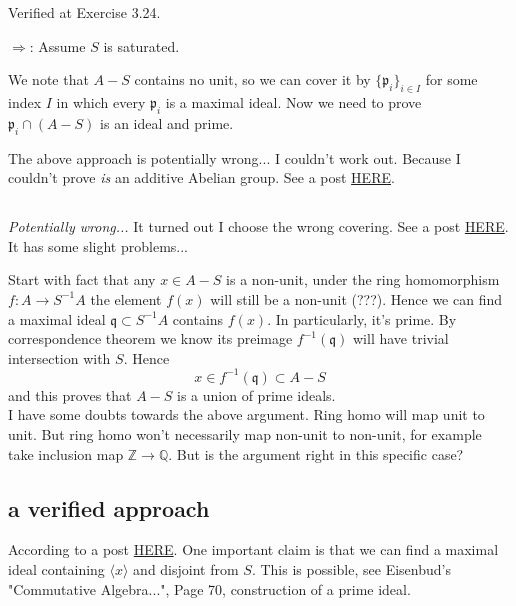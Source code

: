 Verified at \cite{altman} Exercise 3.24. 

$\Rightarrow$: Assume $S$ is saturated. 

We note that $A-S$ contains no unit, so we can cover it by $\{\mathfrak p_i\}_{i\in I}$ for some index $I$ in which every $\mathfrak p_i$ is a maximal ideal. 
Now we need to prove $\mathfrak p_i\cap (A-S)$ is an ideal and prime. 

The above approach is potentially wrong... I couldn't work out. Because I couldn't prove \textit{is} an additive Abelian group. 
See a post \href{https://math.stackexchange.com/questions/4329999/saturated-set-and-union-of-prime-ideals}{HERE}. 

\subsection{}
\textit{Potentially wrong...}
It turned out I choose the wrong covering. See a post \href{https://math.stackexchange.com/questions/3988316/proof-verification-atiyah-macdonald-exercise-3-7i}{HERE}. It has some slight problems...

Start with fact that any $x\in A-S$ is a non-unit, under the ring homomorphism $f:A\to S^{-1}A$ the element $f(x)$ will still be a non-unit (???). Hence we can find a maximal ideal $\mathfrak q\subset S^{-1}A$ contains $f(x)$. In particularly, it's prime. By correspondence theorem we know its preimage $f^{-1}(\mathfrak q)$ will have trivial intersection with $S$. Hence 
$$x\in f^{-1}(\mathfrak q)\subset A-S$$ and this proves that $A-S$ is a union of prime ideals.\\

I have some doubts towards the above argument. Ring homo will map unit to unit. But ring homo won't necessarily map non-unit to non-unit, for example take inclusion map $\mathbb Z\to \mathbb Q$. 
But is the argument right in this specific case?

\subsection{a verified approach}

According to a post \href{https://math.stackexchange.com/questions/57684/complement-of-saturated-set}{HERE}. One important claim is that we can find a maximal ideal containing $\langle x\rangle$ and disjoint from $S$. This is possible, see Eisenbud's "Commutative Algebra...", Page 70, construction of a prime ideal.

